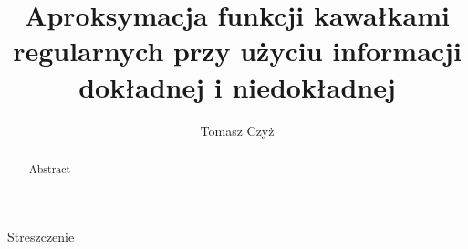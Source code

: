 \documentclass[oik, pdftex, man]{mgrwms}
\begin{document}
\title{ \LARGE Aproksymacja funkcji kawałkami regularnych przy użyciu informacji dokładnej i niedokładnej}
\author{Tomasz Czyż}
\maketitle

\renewcommand{\figurename}{Rys.}

\newtheorem{thm}{Twierdzenie}[chapter]
\newtheorem{lemma}[thm]{Lemat}
\newtheorem{stw}[thm]{Stwierdzenie}
\newtheorem{cor}[thm]{Wniosek}
\newtheorem{obs}[thm]{Obserwacja}
\newtheorem{uw}[thm]{Uwaga}
\newtheorem{df}[thm]{Definicja}
\newcommand{\E}{\mathbb{E}}
\newcommand{\R}{\mathbb{R}}
\newcommand{\Pra}{\mathbb{Pra}}
\newcommand{\F}{\mathcal{F}}
\newcommand{\1}{\mathbbm{1}}
\newcommand{\Galphabeta}{\mathcal{G}_{r,\varrho}([\alpha,\beta])}
\newcommand{\G}{\mathcal{G}_{r,\varrho}}
\newcommand{\wor}{\mathrm{wor}}
\newcommand{\reg}{\mathrm{reg}}
\newcommand{\cost}{\mathrm{cost}}
\newcommand{\comp}{\mathrm{comp}}
\newcommand{\po}{\hat{t}}

\makeatletter
\newcommand*{\defeq}{\mathrel{\rlap{%
                     \raisebox{0.3ex}{$\m@th\cdot$}}%
                     \raisebox{-0.3ex}{$\m@th\cdot$}}%
                     =}
\let\c@table\c@figure
\makeatother


\tableofcontents


\begin{streszczenie}
    Streszczenie
\end{streszczenie}


\begin{abstract}
    Abstract
\end{abstract}


\end{document}
